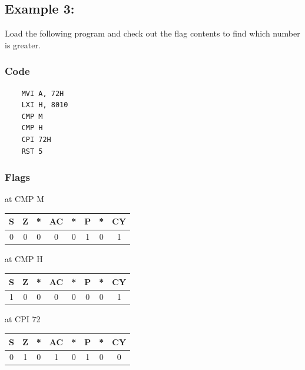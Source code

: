 \documentclass[]{report}
\begin{document}
\vspace{10mm}
\subsection*{Example 3:}
Load the following program and check out the flag contents to find which number is greater.
\subsubsection{Code}
\begin{verbatim}
    MVI A, 72H
    LXI H, 8010
    CMP M
    CMP H
    CPI 72H
    RST 5
\end{verbatim}
\subsubsection{Flags}
at CMP M \\
\begin{tabular}{cccccccc}
\hline
    S & Z & *  & AC & *  & P & *  & CY  \\
    \hline
    0&0&0&0&0&1&0&1\\
    \hline
\end{tabular}

\vspace{5mm}
at CMP H \\
\begin{tabular}{cccccccc}
\hline
    S & Z & *  & AC & *  & P & *  & CY  \\
    \hline
    1&0&0&0&0&0&0&1\\
    \hline
\end{tabular}

\vspace{5mm}
at CPI 72 \\
\begin{tabular}{cccccccc}
\hline
    S & Z & *  & AC & *  & P & *  & CY  \\
    \hline
    0&1&0&1&0&1&0&0\\
    \hline
\end{tabular}
\end{document}
